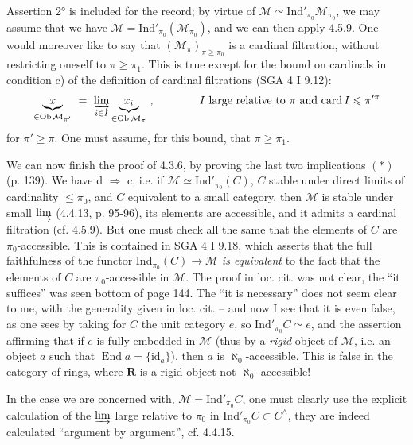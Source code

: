 \documentclass[11pt]{article}
\newcommand{\msp}[1]{\marginpar{\footnotesize [#1]}}
\newcommand{\Ind}{\mathrm{Ind}}
\begin{document}
Assertion 2° is included for the record; by virtue of $\mathcal{M}\simeq\Ind'_{\pi_0}\mathcal{M}_{\pi_0}$, we may assume that we have $\mathcal{M}=\Ind'_{\pi_0}(\mathcal{M}_{\pi_0})$, and we can then apply 4.5.9. One would moreover like to say that $(\mathcal{M}_\pi)_{\pi\geqslant\pi_0}$ is a cardinal filtration, without restricting oneself to $\pi\geqslant\pi_1$. This is true except for the bound on cardinals in condition c) of the definition of cardinal filtrations (SGA 4 I 9.12):
\[
\underbrace{x}_{\in\operatorname{Ob}\mathcal{M}_{\pi'}} \ =\ \varinjlim_{i\in I}\underbrace{x_i}_{\in\operatorname{Ob}\mathcal{M}_{\pi}}\ , \qquad\qquad \text{$I$ large relative to $\pi$ and $\operatorname{card}I\leqslant\pi'^{\pi}$}
\]
for $\pi'\geqslant\pi$. One must assume, for this bound, that $\pi\geqslant\pi_1$.

\msp{page 147}

We can now finish the proof of 4.3.6, by proving the last two implications $(*)$ (p. 139). We have d $\Longrightarrow$ c, i.e. if $\mathcal{M}\simeq\Ind'_{\pi_0}(C)$, $C$ stable under direct limits of cardinality $\leqslant\pi_0$, and $C$ equivalent to a small category, then $\mathcal{M}$ is stable under small $\varinjlim$ (4.4.13, p. 95-96), its elements are accessible, and it admits a cardinal filtration (cf. 4.5.9). But one must check all the same that the elements of $C$ are $\pi_0$-accessible. This is contained in SGA 4 I 9.18, which asserts that the full faithfulness of the functor $\Ind_{\pi_0}(C)\longrightarrow\mathcal{M}$ \textit{is equivalent} to the fact that the elements of $C$ are $\pi_0$-accessible in $\mathcal{M}$. The proof in loc. cit. was not clear, the ``it suffices'' was seen bottom of page 144. The ``it is necessary'' does not seem clear to me, with the generality given in loc. cit. – and now I see that it is even false, as one sees by taking for $C$ the unit category $e$, so $\Ind'_{\pi_0}C\simeq e$, and the assertion affirming that if $e$ is fully embedded in $\mathcal{M}$ (thus by a \textit{rigid} object of $\mathcal{M}$, i.e. an object $a$ such that $\operatorname{End}a=\{\mathrm{id}_a\}$), then $a$ is $\aleph_0$-accessible. This is false in the category of rings, where $\mathbf{R}$ is a rigid object not $\aleph_0$-accessible!

\msp{page 148}

In the case we are concerned with, $\mathcal{M}=\Ind'_{\pi_0}C$, one must clearly use the explicit calculation of the $\varinjlim$ large relative to $\pi_0$ in $\Ind'_{\pi_0}C\subset C^{\wedge}$, they are indeed calculated ``argument by argument'', cf. 4.4.15.
\end{document}
